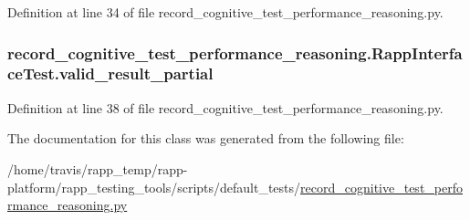 Definition at line 34 of file record\-\_\-cognitive\-\_\-test\-\_\-performance\-\_\-reasoning.\-py.

\hypertarget{classrecord__cognitive__test__performance__reasoning_1_1RappInterfaceTest_a88b41c18bd3d4b835f7f693a88669a32}{
\subsubsection[{valid\-\_\-result\-\_\-partial}]{\setlength{\rightskip}{0pt plus 5cm}record\-\_\-cognitive\-\_\-test\-\_\-performance\-\_\-reasoning.\-Rapp\-Interface\-Test.\-valid\-\_\-result\-\_\-partial}}\label{classrecord__cognitive__test__performance__reasoning_1_1RappInterfaceTest_a88b41c18bd3d4b835f7f693a88669a32}


Definition at line 38 of file record\-\_\-cognitive\-\_\-test\-\_\-performance\-\_\-reasoning.\-py.



The documentation for this class was generated from the following file\-:\begin{DoxyCompactItemize}
\item 
/home/travis/rapp\-\_\-temp/rapp-\/platform/rapp\-\_\-testing\-\_\-tools/scripts/default\-\_\-tests/\hyperlink{record__cognitive__test__performance__reasoning_8py}{record\-\_\-cognitive\-\_\-test\-\_\-performance\-\_\-reasoning.\-py}\end{DoxyCompactItemize}

